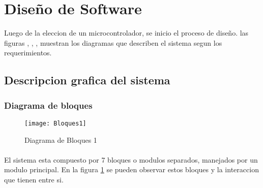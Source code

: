\section{Dise\~no de Software}

Luego de la eleccion de un microcontrolador, se inicio el proceso de dise\~no. las figuras , , , muestran los diagramas que describen el sistema segun los requerimientos.

\subsection{Descripcion grafica del sistema}
\subsubsection{Diagrama de bloques}
\begin{figure}[h]
  \centering
  \texttt{[image: Bloques1]}
  \caption{Diagrama de Bloques 1}\label{fig:bloques1}
\end{figure}

\paragraph{}
El sistema esta compuesto por 7 bloques o modulos separados, manejados por un modulo principal. En la figura \ref{fig:bloques1} se pueden observar estos bloques y la interaccion que tienen entre si.
\paragraph{}



